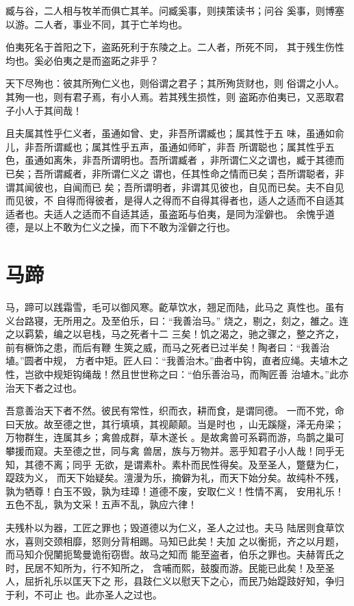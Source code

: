 \documentclass[a4paper,12pt,UTF8,twoside]{ctexbook}
\begin{document}
臧与谷，二人相与牧羊而俱亡其羊。问臧奚事，则挟策读书；问谷 奚事，则博塞以游。二人者，事业不同，其于亡羊均也。

伯夷死名于首阳之下，盗跖死利于东陵之上。二人者，所死不同， 其于残生伤性均也。奚必伯夷之是而盗跖之非乎？

天下尽殉也：彼其所殉仁义也，则俗谓之君子；其所殉货财也，则 俗谓之小人。其殉一也，则有君子焉，有小人焉。若其残生损性，则 盗跖亦伯夷已，又恶取君子小人于其间哉！

且夫属其性乎仁义者，虽通如曾、史，非吾所谓臧也；属其性于五 味，虽通如俞儿，非吾所谓臧也；属其性乎五声，虽通如师旷，非吾 所谓聪也；属其性乎五色，虽通如离朱，非吾所谓明也。吾所谓臧者 ，非所谓仁义之谓也，臧于其德而已矣；吾所谓臧者，非所谓仁义之 谓也，任其性命之情而已矣；吾所谓聪者，非谓其闻彼也，自闻而已 矣；吾所谓明者，非谓其见彼也，自见而已矣。夫不自见而见彼，不 自得而得彼者，是得人之得而不自得其得者也，适人之适而不自适其 适者也。夫适人之适而不自适其适，虽盗跖与伯夷，是同为淫僻也。 余愧乎道德，是以上不敢为仁义之操，而下不敢为淫僻之行也。


\section{马蹄}

马，蹄可以践霜雪，毛可以御风寒。齕草饮水，翘足而陆，此马之 真性也。虽有义台路寝，无所用之。及至伯乐，曰：“我善治马。” 烧之，剔之，刻之，雒之。连之以羁絷，编之以皂栈，马之死者十二 三矣！饥之渴之，驰之骤之，整之齐之，前有橛饰之患，而后有鞭 生筴之威，而马之死者已过半矣！陶者曰：“我善治埴。”圆者中规， 方者中矩。匠人曰：“我善治木。”曲者中钩，直者应绳。夫埴木之 性，岂欲中规矩钩绳哉！然且世世称之曰：“伯乐善治马，而陶匠善 治埴木。”此亦治天下者之过也。

吾意善治天下者不然。彼民有常性，织而衣，耕而食，是谓同德。 一而不党，命曰天放。故至德之世，其行填填，其视颠颠。当是时也 ，山无蹊隧，泽无舟梁；万物群生，连属其乡；禽兽成群，草木遂长 。是故禽兽可系羁而游，鸟鹊之巢可攀援而窥。夫至德之世，同与禽 兽居，族与万物并。恶乎知君子小人哉！同乎无知，其德不离；同乎 无欲，是谓素朴。素朴而民性得矣。及至圣人，蹩躠为仁，踶跂为义， 而天下始疑矣。澶漫为乐，摘僻为礼，而天下始分矣。故纯朴不残， 孰为牺尊！白玉不毁，孰为珪璋！道德不废，安取仁义！性情不离， 安用礼乐！五色不乱，孰为文采！五声不乱，孰应六律！

夫残朴以为器，工匠之罪也；毁道德以为仁义，圣人之过也。夫马 陆居则食草饮水，喜则交颈相靡，怒则分背相踢。马知已此矣！夫加 之以衡扼，齐之以月题，而马知介倪闉扼鸷曼诡衔窃辔。故马之知而 能至盗者，伯乐之罪也。夫赫胥氏之时，民居不知所为，行不知所之， 含哺而熙，鼓腹而游。民能已此矣！及至圣人，屈折礼乐以匡天下之 形，县跂仁义以慰天下之心，而民乃始踶跂好知，争归于利，不可止 也。此亦圣人之过也。
\end{document}
